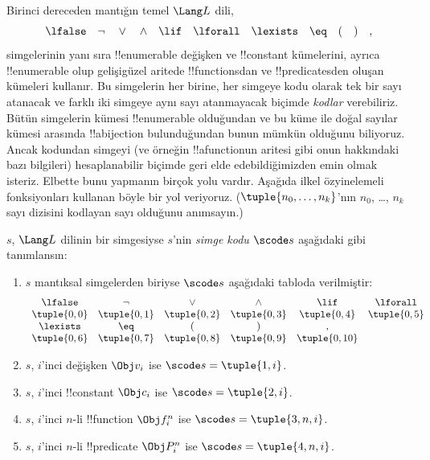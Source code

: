 


Birinci dereceden mantığın temel $\Lang L$ dili,
\[
\lfalse \quad \lnot \quad \lor \quad \land \quad \lif \quad \lforall
\quad \lexists \quad \eq \quad ( \quad ) \quad ,
\]
simgelerinin yanı sıra !!{enumerable} değişken ve !!{constant} kümelerini,
ayrıca !!{enumerable} olup gelişigüzel aritede !!{function}s{}dan ve
!!{predicate}s{}den oluşan kümeleri kullanır. Bu simgelerin her birine, her simgeye kodu
olarak tek bir sayı atanacak ve farklı iki simgeye aynı sayı atanmayacak
biçimde \emph{kodlar} verebiliriz. Bütün simgelerin kümesi !!{enumerable}
olduğundan ve bu küme ile doğal sayılar kümesi arasında !!a{bijection}
bulunduğundan bunun mümkün olduğunu biliyoruz. Ancak kodundan simgeyi (ve
örneğin !!a{function}{}un aritesi gibi onun hakkındaki bazı bilgileri)
hesaplanabilir biçimde geri elde edebildiğimizden emin olmak isteriz. Elbette
bunu yapmanın birçok yolu vardır. Aşağıda ilkel özyinelemeli fonksiyonları
kullanan böyle bir yol veriyoruz. ($\tuple{n_0, \dots, n_k}$'nın
$n_0$, \dots, $n_k$ sayı dizisini kodlayan sayı olduğunu anımsayın.)

\begin{defn}
$s$, $\Lang L$ dilinin bir simgesiyse $s$'nin \emph{simge kodu}
$\scode s$ aşağıdaki gibi tanımlansın:
\begin{enumerate}
\item $s$ mantıksal simgelerden biriyse $\scode s$ aşağıdaki tabloda
  verilmiştir:
\[
\begin{array}{cccccccccc}
  \lfalse & \lnot & \lor & \land & \lif & \lforall \\
\tuple{0, 0} & \tuple{0, 1} & \tuple{0, 2} & \tuple{0, 3} &
\tuple{0, 4} & \tuple{0, 5} \\
\lexists & \eq & ( & ) & ,\\
\tuple{0, 6} & \tuple{0, 7} &
\tuple{0, 8} & \tuple{0, 9} & \tuple{0, 10}
\end{array}
\]
\item $s$, $i$'inci değişken $\Obj v_i$ ise $\scode s = \tuple{1, i}$.
\item $s$, $i$'inci !!{constant} $\Obj c_i$ ise
  $\scode s = \tuple{2, i}$.
\item $s$, $i$'inci $n$-li !!{function} $\Obj f_i^n$ ise
  $\scode s = \tuple{3, n, i}$.
\item $s$, $i$'inci $n$-li !!{predicate} $\Obj P_i^n$ ise
  $\scode s = \tuple{4, n, i}$.
\end{enumerate}
\end{defn}

